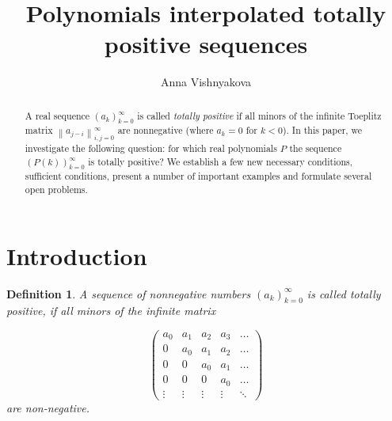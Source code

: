 \documentclass[12pt]{amsart}
\newcounter{count}
\numberwithin{count}{section}
\newtheorem{Definition}[count]{Definition}
\begin{document}
\author[A.~Vishnyakova]{Anna Vishnyakova}

\address{Department of Mathematics, Holon Institute of Technology,
Israel}


\title[Polynomials interpolated totally positive sequences]
{Polynomials interpolated totally positive sequences}
\maketitle

\begin{abstract}
A real sequence  $(a_k)_{k=0}^\infty$ is called {\it totally positive}  
if all minors of the infinite Toeplitz matrix $ \left\| a_{j-i}  
\right\|_{i, j =0}^\infty$ are nonnegative (where $a_k=0$
for $k<0$). In this paper, we investigate the following question:
for which real polynomials $P$ the sequence $(P(k))_{k=0}^\infty$
is totally positive? We establish a few new necessary conditions, 
sufficient conditions, present a number of  important examples and formulate
several open problems.

\end{abstract}





\section{Introduction}

\begin{Definition}
 A sequence of nonnegative numbers $(a_k)_{k=0}^\infty$
is called  totally positive, if all minors of the
infinite matrix

\begin {equation}
\label{mat}
 \left(
  \begin{array}{ccccc}
   a_0 & a_1 & a_2 & a_3 &\ldots \\
   0   & a_0 & a_1 & a_2 &\ldots \\
   0   &  0  & a_0 & a_1 &\ldots \\
   0   &  0  &  0  & a_0 &\ldots \\
   \vdots&\vdots&\vdots&\vdots&\ddots
  \end{array}
 \right)
\end {equation}
 are non-negative. 
\end{Definition}
\end{document}

